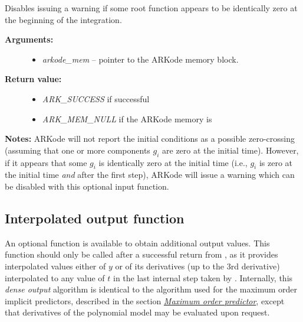 \documentclass[letterpaper,10pt,english]{sphinxmanual}
\begin{document}
\begin{fulllineitems}
\label{c_interface/User_callable:ARKodeSetNoInactiveRootWarn}
Disables issuing a warning if some root function appears
to be identically zero at the beginning of the integration.
\begin{description}
\item[{\textbf{Arguments:}}] \leavevmode\begin{itemize}
\item {} 
\emph{arkode\_mem} -- pointer to the ARKode memory block.

\end{itemize}

\item[{\textbf{Return value:}}] \leavevmode\begin{itemize}
\item {} 
\emph{ARK\_SUCCESS} if successful

\item {} 
\emph{ARK\_MEM\_NULL} if the ARKode memory is 

\end{itemize}

\end{description}

\textbf{Notes:} ARKode will not report the initial conditions as a
possible zero-crossing (assuming that one or more components
$g_i$ are zero at the initial time).  However, if it appears
that some $g_i$ is identically zero at the initial time
(i.e., $g_i$ is zero at the initial time \emph{and} after the
first step), ARKode will issue a warning which can be disabled with
this optional input function.

\end{fulllineitems}



\subsection{Interpolated output function}
\label{c_interface/User_callable:cinterface-interpolatedoutput}\label{c_interface/User_callable:interpolated-output-function}
An optional function {\hyperref[c_interface/User_callable:ARKodeGetDky]{}} is available to obtain
additional output values.  This function should only be called after a
successful return from {\hyperref[c_interface/User_callable:ARKode]{}}, as it provides interpolated
values either of $y$ or of its derivatives (up to the 3rd
derivative) interpolated to any value of $t$ in the last
internal step taken by {\hyperref[c_interface/User_callable:ARKode]{}}.  Internally, this \emph{dense
output} algorithm is identical to the algorithm used for the maximum
order implicit predictors, described in the section
{\hyperref[Mathematics:mathematics-predictors-max]{\emph{Maximum order predictor}}}, except that derivatives of the
polynomial model may be evaluated upon request.
\end{document}
